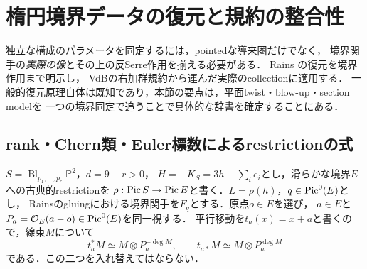 \section{楕円境界データの復元と規約の整合性}\label{sec:boundarydata}
独立な構成のパラメータを同定するには，pointedな導来圏だけでなく，
境界関手の\emph{実際の像}とその上の反Serre作用を揃える必要がある．
Rains \cite[(4.11)--(4.13)]{Filtered}の復元を境界作用まで明示し，
VdBの右加群規約から運んだ実際のcollectionに適用する．
一般的復元原理自体は既知であり，本節の要点は，平面twist・blow-up・section modelを
一つの境界同定で追うことで具体的な辞書を確定することにある．

\subsection{rank・Chern類・Euler標数によるrestrictionの式}
$S=\operatorname{Bl}_{p_1,\ldots,p_r}\mathbb P^2$，$d=9-r>0$，
$H=-K_S=3h-\sum_i e_i$とし，滑らかな境界$E$への古典的restrictionを
$\rho:\operatorname{Pic} S\to\operatorname{Pic} E$と書く．$L=\rho(h)$，$q\in\operatorname{Pic}^0(E)$とし，
Rainsのgluingにおける境界関手を$F_q$とする．原点$o\in E$を選び，
$a\in E$と$P_a=\mathcal O_E(a-o)\in\operatorname{Pic}^0(E)$を同一視する．
平行移動を$t_a(x)=x+a$と書くので，線束$M$について
\begin{equation}\label{eq:translation-convention}
 t_a^*M\simeq M\otimes P_a^{-\deg M},\qquad
 t_{a*}M\simeq M\otimes P_a^{\deg M}
\end{equation}
である．この二つを入れ替えてはならない．

